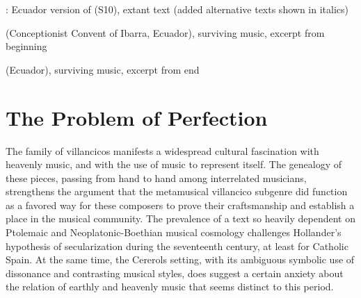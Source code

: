 
\begin{poemexample}
    \caption{: Ecuador version of
     (S10), extant text (added alternative texts
    shown in italics)}
    \label{poem:Suspended-Ecuador}
\end{poemexample}

\begin{musicexample}
    \caption{ (Conceptionist Convent of
    Ibarra, Ecuador), surviving music, excerpt from beginning}
    \label{mus:Suspended-Ecuador-1}
\end{musicexample}

\begin{musicexample}
    \caption{ (Ecuador), surviving music,
    excerpt from end}
    \label{mus:Suspended-Ecuador-2}
\end{musicexample}


\section{The Problem of Perfection}

The family of  villancicos manifests a widespread
cultural fascination with heavenly music, and with the use of music to
represent itself.
The genealogy of these pieces, passing from hand to hand among interrelated
musicians, strengthens the argument that the metamusical villancico subgenre did
function as a favored way for these composers to prove their craftsmanship and
establish a place in the musical community.
The prevalence of a text so heavily dependent on Ptolemaic and
Neoplatonic-Boethian musical cosmology challenges Hollander's hypothesis of
secularization during the seventeenth century, at least for Catholic Spain.
At the same time, the Cererols setting, with its ambiguous symbolic use of
dissonance and contrasting musical styles, does suggest a certain anxiety about
the relation of earthly and heavenly music that seems distinct to this period.


